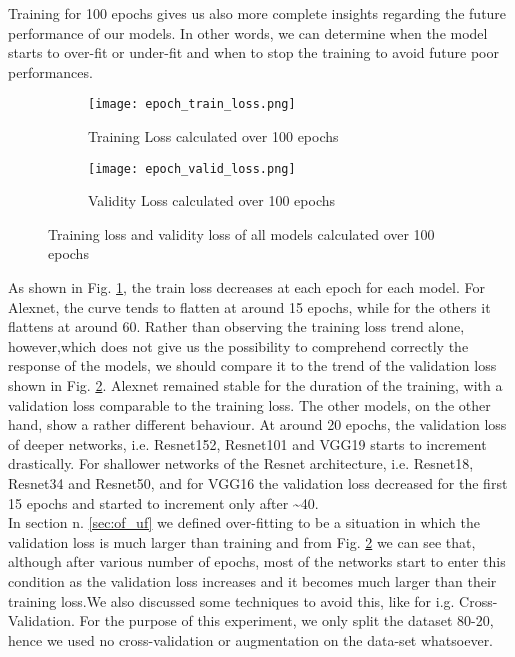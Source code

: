 Training for 100 epochs gives us also more complete insights regarding the future performance of our models. In other words, we can determine when the model starts to over-fit or under-fit and when to stop the training to avoid future poor performances. \\
\begin{figure}[h]
\begin{subfigure}{0.5\textwidth}
	    \texttt{[image: epoch\_train\_loss.png]}
	    \caption{Training Loss calculated over 100 epochs}
        \label{fig:train_loss}
        
     \end{subfigure} \hfill
     \begin{subfigure}{0.5\textwidth}
	    \texttt{[image: epoch\_valid\_loss.png]}
	    \caption{Validity Loss calculated over 100 epochs}
         \label{fig:valid_loss}
         
     \end{subfigure}
    
     
     \caption{ Training loss and validity loss of all models calculated over 100 epochs}
        \label{fig:tran_valid_loss}
\end{figure}


As shown in Fig. \ref{fig:train_loss}, the train loss decreases at each epoch for each model. For Alexnet, the curve tends to flatten at around 15 epochs, while for the others it flattens at around 60. Rather than observing the training loss trend alone, however,which does not give us the possibility to comprehend correctly the response of the models, we should compare it to the trend of the validation loss shown in Fig. \ref{fig:valid_loss}. Alexnet remained stable for the duration of the training, with a validation loss comparable to the training loss. The other models, on the other hand, show a rather different behaviour. At around 20 epochs, the validation loss of deeper networks, i.e. Resnet152, Resnet101 and VGG19 starts to increment drastically. For shallower networks of the Resnet architecture, i.e. Resnet18, Resnet34 and Resnet50, and for VGG16 the validation loss decreased for the first 15 epochs and started to increment only after \textasciitilde40.\\
In section n. \ref{sec:of_uf} we defined over-fitting to be a situation in which the validation loss is much larger than training and from Fig. \ref{fig:valid_loss} we can see that, although after various number of epochs, most of the networks start to enter this condition as the validation loss increases and it becomes much larger than their training loss.We also discussed some techniques to avoid this, like for i.g. Cross-Validation. For the purpose of this experiment, we only split the dataset 80-20, hence we used no cross-validation or augmentation on the data-set whatsoever. \\
 
